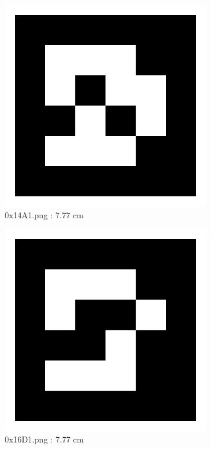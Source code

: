 \documentclass[11pt,a4,BCOR=0cm]{scrartcl}
\begin{document}
\begin{figure}
  \centering
    \includegraphics[natwidth=400,natheight=400,width=9cm]{0x14A1.png}
    \caption{0x14A1.png : 7.77 cm}
    \label{fig:0x14A1.png}
  
\end{figure} 

\clearpage

\begin{figure}
  \centering
    \includegraphics[natwidth=400,natheight=400,width=9cm]{0x16D1.png}
    \caption{0x16D1.png : 7.77 cm}
    \label{fig:0x16D1.png}
  
\end{figure} 
\end{document}
